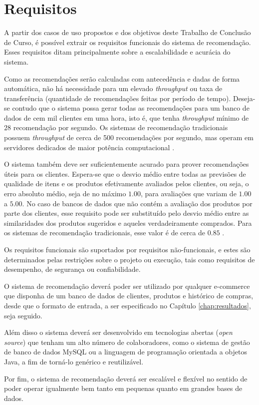 \chapter[Requisitos]{Requisitos}
\label{chap:requisitos}

A partir dos casos de uso propostos e dos objetivos deste Trabalho de Conclusão de Curso, é possível extrair os requisitos funcionais do sistema de recomendação. Esses requisitos ditam principalmente sobre a escalabilidade e acurácia do sistema.

Como as recomendações serão calculadas com antecedência e dadas de forma automática, não há necessidade para um elevado \textit{throughput} ou taxa de transferência (quantidade de recomendações feitas por período de tempo). Deseja-se contudo que o sistema possa gerar todas as recomendações para um banco de dados de cem mil clientes em uma hora, isto é, que tenha \textit{throughput} mínimo de $28$ recomendação por segundo. Os sistemas de recomendação tradicionais possuem \textit{throughput} de cerca de 500 recomendações por segundo, mas operam em servidores dedicados de maior potência computacional \cite{sarwar2001item}.  

O sistema também deve ser suficientemente acurado para prover recomendações úteis para os clientes. Espera-se que o desvio médio entre todas as previsões de qualidade de itens e os produtos efetivamente avaliados pelos clientes, ou seja, o erro absoluto médio, seja de no máximo $1.00$, para avaliações que variam de $1.00$ a $5.00$. No caso de bancos de dados que não contém a avaliação dos produtos por parte dos clientes, esse requisito pode ser substituído pelo desvio médio entre as similaridades dos produtos sugeridos e aqueles verdadeiramente comprados. Para os sistemas de recomendação tradicionais, esse valor é de cerca de $0.85$ \cite{sarwar2002recommender}.

Os requisitos funcionais são suportados por requisitos não-funcionais, e estes são determinados pelas restrições sobre o projeto ou execução, tais como requisitos de desempenho, de segurança ou confiabilidade. 

O sistema de recomendação deverá poder ser utilizado por qualquer e-commerce que disponha de um banco de dados de clientes, produtos e histórico de compras, desde que o formato de entrada, a ser especificado no Capítulo \ref{chap:resultados}, seja seguido.

Além disso o sistema deverá ser desenvolvido em tecnologias abertas (\textit{open source}) que tenham um alto número de colaboradores, como o sistema de gestão de banco de dados MySQL ou a linguagem de programação orientada a objetos Java, a fim de torná-lo genérico e reutilizável.

Por fim, o sistema de recomendação deverá ser escalável e flexível no sentido de poder operar igualmente bem tanto em pequenas quanto em grandes bases de dados.